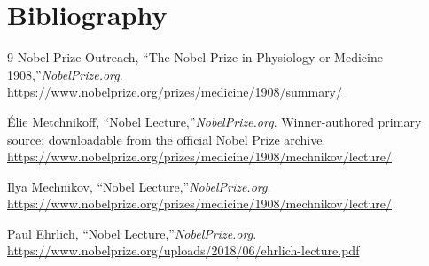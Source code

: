 \section{Bibliography}

\begin{thebibliography}{9}
Nobel Prize Outreach, ``The Nobel Prize in Physiology or Medicine 1908,''\emph{NobelPrize.org}.\\
\url{https://www.nobelprize.org/prizes/medicine/1908/summary/}

\'{E}lie Metchnikoff, ``Nobel Lecture,''\emph{NobelPrize.org}. Winner-authored primary source; downloadable from the official Nobel Prize archive.\\
\url{https://www.nobelprize.org/prizes/medicine/1908/mechnikov/lecture/}

Ilya Mechnikov, ``Nobel Lecture,''\emph{NobelPrize.org}.\\
\url{https://www.nobelprize.org/prizes/medicine/1908/mechnikov/lecture/}

Paul Ehrlich, ``Nobel Lecture,''\emph{NobelPrize.org}.\\
\url{https://www.nobelprize.org/uploads/2018/06/ehrlich-lecture.pdf}
\end{thebibliography}
